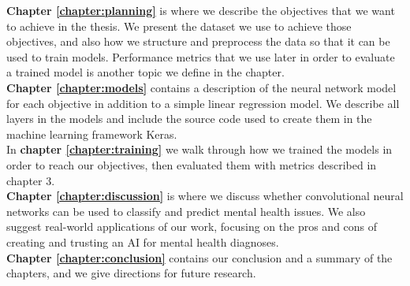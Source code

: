 \noindent \textbf{Chapter \ref{chapter:planning}} is where we describe the objectives that we want to achieve in the thesis. We present the dataset we use to achieve those objectives, and also how we structure and preprocess the data so that it can be used to train models. Performance metrics that we use later in order to evaluate a trained model is another topic we define in the chapter.\\

\noindent \textbf{Chapter \ref{chapter:models}} contains a description of the neural network model for each objective in addition to a simple linear regression model. We describe all layers in the models and include the source code used to create them in the machine learning framework Keras. \\

\noindent In \textbf{chapter \ref{chapter:training}} we walk through how we trained the models in order to reach our objectives, then evaluated them with metrics described in chapter 3. \\

\noindent \textbf{Chapter \ref{chapter:discussion}} is where we discuss whether convolutional neural networks can be used to classify and predict mental health issues. We also suggest real-world applications of our work, focusing on the pros and cons of creating and trusting an AI for mental health diagnoses. \\

\noindent \textbf{Chapter \ref{chapter:conclusion}} contains our conclusion and a summary of the chapters, and we give directions for future research.

